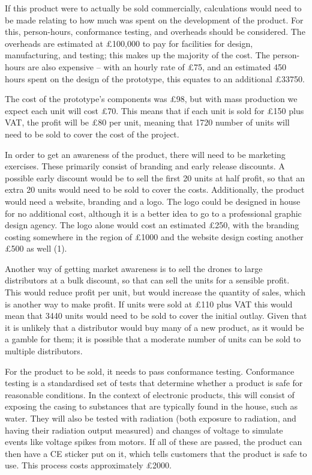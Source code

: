 \documentclass[a4paper]{article}
\begin{document}
If this product were to actually be sold commercially, calculations would need to be made relating to how much was spent on the development of the product. For this, person-hours, conformance testing, and overheads should be considered. The overheads are estimated at £100,000 to pay for facilities for design, manufacturing, and testing; this makes up the majority of the cost. The person-hours are also expensive – with an hourly rate of £75, and an estimated 450 hours spent on the design of the prototype, this equates to an additional £33750.

The cost of the prototype’s components was £98, but with mass production we expect each unit will cost £70. This means that if each unit is sold for £150 plus VAT, the profit will be £80 per unit, meaning that 1720 number of units will need to be sold to cover the cost of the project.

In order to get an awareness of the product, there will need to be marketing exercises. These primarily consist of branding and early release discounts. A possible early discount would be to sell the first 20 units at half profit, so that an extra 20 units would need to be sold to cover the costs. Additionally, the product would need a website, branding and a logo. The logo could be designed in house for no additional cost, although it is a better idea to go to a professional graphic design agency. The logo alone would cost an estimated £250, with the branding costing somewhere in the region of £1000 and the website design costing another £500 as well (1).

Another way of getting market awareness is to sell the drones to large distributors at a bulk discount, so that can sell the units for a sensible profit. This would reduce profit per unit, but would increase the quantity of sales, which is another way to make profit. If units were sold at £110 plus VAT this would mean that 3440 units would need to be sold to cover the initial outlay. Given that it is unlikely that a distributor would buy many of a new product, as it would be a gamble for them; it is possible that a moderate number of units can be sold to multiple distributors.

For the product to be sold, it needs to pass conformance testing. Conformance testing is a standardised set of tests that determine whether a product is safe for reasonable conditions. In the context of electronic products, this will consist of exposing the casing to substances that are typically found in the house, such as water. They will also be tested with radiation (both exposure to radiation, and having their radiation output measured) and changes of voltage to simulate events like voltage spikes from motors. If all of these are passed, the product can then have a CE sticker put on it, which tells customers that the product is safe to use. This process costs approximately £2000.
\end{document}
